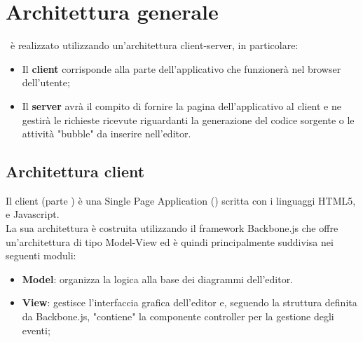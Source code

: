 \documentclass[../PianoDiQualifica.tex]{subfiles}
\begin{document}
	\section{Architettura generale}
		\progetto\ è realizzato utilizzando un'architettura client-server, in particolare:
		\begin{itemize}
			\item Il \textbf{client} corrisponde alla parte dell'applicativo che funzionerà nel
			browser dell'utente;
			\item Il \textbf{server} avrà il compito di fornire la pagina dell'applicativo al client
			e ne gestirà le richieste ricevute riguardanti la generazione del codice sorgente o le
			attività "bubble" da inserire nell'editor.
		\end{itemize}
		\subsection{Architettura client}
			Il client (parte ) è una Single Page Application () scritta con i linguaggi
			HTML5,  e Javascript.\\
			La sua architettura è costruita utilizzando il framework Backbone.js che offre
			un'architettura di tipo Model-View ed è quindi principalmente suddivisa nei seguenti moduli:
			\begin{itemize}
				\item \textbf{Model}: organizza la logica alla base dei diagrammi dell'editor.
				\item \textbf{View}: gestisce l'interfaccia grafica dell'editor e, seguendo la struttura
				definita da Backbone.js, "contiene" la componente controller per la gestione
				degli eventi; 
			\end{itemize}
\end{document}
